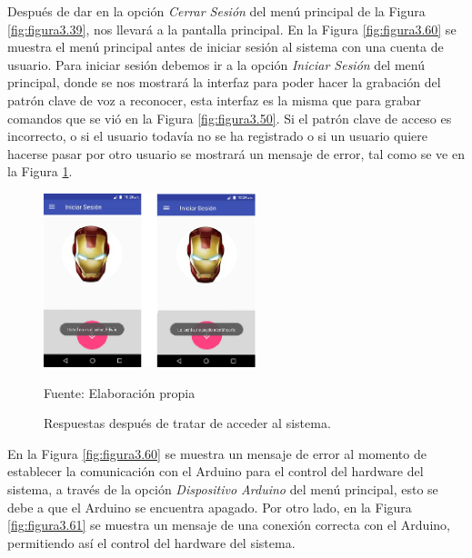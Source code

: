 \vskip -0.5cm
Después de dar en la opción \textit{Cerrar Sesión} del menú principal de la Figura \ref{fig:figura3.39}, nos llevará a la pantalla principal. En la Figura \ref{fig:figura3.60} se muestra el menú principal antes de iniciar sesión al sistema con una cuenta de usuario. Para iniciar sesión debemos ir a la opción \textit{Iniciar Sesión} del menú principal, donde se nos mostrará la interfaz para poder hacer la grabación del patrón clave de voz a reconocer, esta interfaz es la misma que para grabar comandos que se vió en la Figura \ref{fig:figura3.50}. Si el patrón clave de acceso es incorrecto, o si el usuario todavía no se ha registrado o si un usuario quiere hacerse pasar por otro usuario se mostrará un mensaje de error, tal como se ve en la Figura \ref{fig:figura3.54}.
\begin{figure}[H]
\captionsetup{justification=centering}
\begin{center}
\includegraphics[width=0.55\textwidth]{Imagenes/Cap3/image054}
\end{center}
\begin{center}
\vskip -0.5cm
\caption{\small{Respuestas después de tratar de acceder al sistema.}}
\label{fig:figura3.54}
{\small{Fuente: Elaboración propia}}
\end{center}
\end{figure}
\vskip -0.5cm
En la Figura \ref{fig:figura3.60} se muestra un mensaje de error al momento de establecer la comunicación con el Arduino para el control del hardware del sistema, a través de la opción \textit{Dispositivo Arduino} del menú principal, esto se debe a que el Arduino se encuentra apagado. Por otro lado, en la Figura \ref{fig:figura3.61} se muestra un mensaje de una conexión correcta con el Arduino, permitiendo así el control del hardware del sistema.
